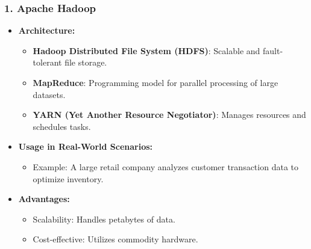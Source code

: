 \documentclass{beamer}
\begin{document}
\begin{frame}[fragile]
    \frametitle{1. Apache Hadoop}
    \begin{itemize}
        \item \textbf{Architecture:}
        \begin{itemize}
            \item \textbf{Hadoop Distributed File System (HDFS)}: Scalable and fault-tolerant file storage.
            \item \textbf{MapReduce}: Programming model for parallel processing of large datasets.
            \item \textbf{YARN (Yet Another Resource Negotiator)}: Manages resources and schedules tasks.
        \end{itemize}
        
        \item \textbf{Usage in Real-World Scenarios:}
        \begin{itemize}
            \item Example: A large retail company analyzes customer transaction data to optimize inventory.
        \end{itemize}
        
        \item \textbf{Advantages:}
        \begin{itemize}
            \item Scalability: Handles petabytes of data.
            \item Cost-effective: Utilizes commodity hardware.
        \end{itemize}
    \end{itemize}
\end{frame}
\end{document}
